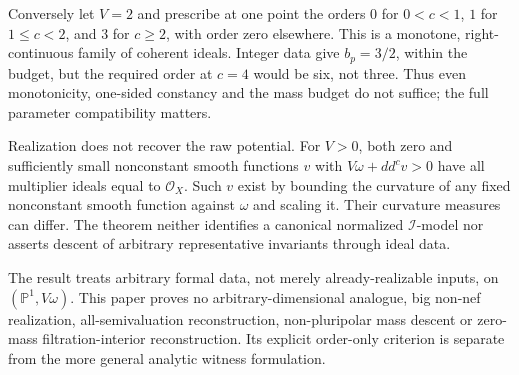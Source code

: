 \documentclass[11pt]{article}
\newcommand{\PP}{\mathbb P}
\newcommand{\OO}{\mathcal O}
\newcommand{\II}{\mathcal I}
\begin{document}
Conversely let $V=2$ and prescribe at one point the orders $0$ for $0<c<1$, $1$ for $1\leq c<2$, and $3$ for $c\geq2$, with order zero elsewhere. This is a monotone, right-continuous family of coherent ideals. Integer data give $b_p=3/2$, within the budget, but the required order at $c=4$ would be six, not three. Thus even monotonicity, one-sided constancy and the mass budget do not suffice; the full parameter compatibility matters.

Realization does not recover the raw potential. For $V>0$, both zero and sufficiently small nonconstant smooth functions $v$ with $V\omega+dd^cv>0$ have all multiplier ideals equal to $\OO_X$. Such $v$ exist by bounding the curvature of any fixed nonconstant smooth function against $\omega$ and scaling it. Their curvature measures can differ. The theorem neither identifies a canonical normalized $\II$-model nor asserts descent of arbitrary representative invariants through ideal data.

The result treats arbitrary formal data, not merely already-realizable inputs, on $(\PP^1,V\omega)$. This paper proves no arbitrary-dimensional analogue, big non-nef realization, all-semivaluation reconstruction, non-pluripolar mass descent or zero-mass filtration-interior reconstruction. Its explicit order-only criterion is separate from the more general analytic witness formulation.
\end{document}
